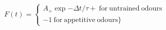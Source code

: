 $F(t) =  \begin{cases} A_{+} \exp{−\Delta t/τ+}\:\mathrm{for\:untrained\:odours}\\-1\:\mathrm{for\:appetitive\:odours}\} \end{cases}$
 